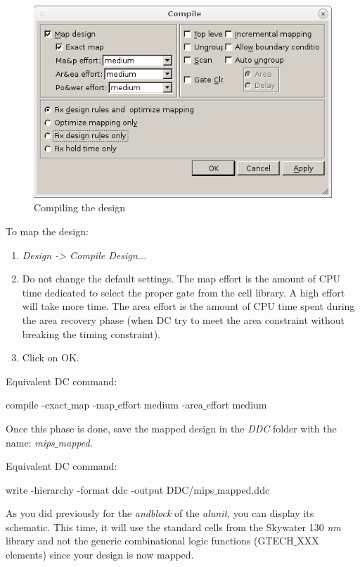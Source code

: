 	\parbox[t]{\dimexpr\textwidth-\leftmargin}{%
	\begin{figure}
		\vspace{0mm}
		\centering
		\vspace{-\baselineskip}
		\includegraphics[scale=0.42]{figures/lab3_design_compiler/compile}
\caption{Compiling the design}
\label{fig_compile}
	\end{figure}
To map the design:
\begin{enumerate}
	\item \textit{Design -> Compile Design...}
	\item Do not change the default settings. The map effort is the amount of CPU time dedicated to select the proper gate from the cell library. A high effort will take more time. The area effort is the amount of CPU time spent during the area recovery phase (when DC try to meet the area constraint without breaking the timing constraint).
	\item Click on OK.
\end{enumerate}
}

Equivalent DC command:
	\begin{codeline}
compile -exact$\_$map -map$\_$effort medium -area$\_$effort medium
\end{codeline}

Once this phase is done, save the mapped design in the \textit{DDC} folder with the name: \textit{mips$\_$mapped}.

Equivalent DC command:
	\begin{codeline}
write -hierarchy -format ddc -output DDC/mips$\_$mapped.ddc
\end{codeline}


\begin{remark}
	As you did previously for the \textit{andblock} of the \textit{alunit}, you can display its schematic. This time, it will use the standard cells from the Skywater 130 \emph{nm} library and not the generic combinational logic functions (GTECH$\_$XXX elements) since your design is now mapped.
	\end{remark}


